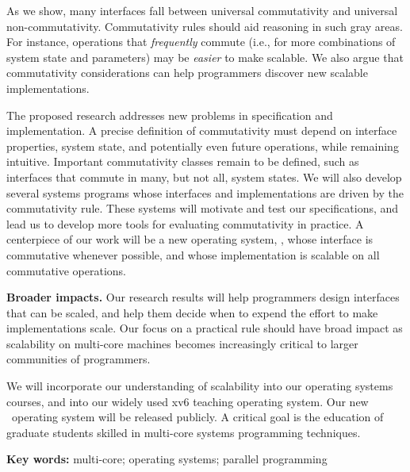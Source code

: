 As we show, many interfaces fall between universal commutativity
and universal non-commutativity.
%
Commutativity rules should aid reasoning in
such gray areas.
%
For instance, operations that \emph{frequently} commute (i.e., for
more combinations of system state and parameters)
may be \emph{easier} to make
scalable.
%
We also argue that commutativity considerations can 
help programmers discover new scalable implementations.

The proposed research addresses new problems in specification and
implementation.
%
A precise definition of commutativity must depend on interface properties,
system state, and potentially even future operations, while remaining
intuitive.
%
Important commutativity classes remain to be defined, such as
interfaces that commute in many, but not all, system states.
%
We will also develop several systems programs whose
interfaces and implementations are driven by the
commutativity rule.
%
These systems will motivate and test our specifications,
and lead us to develop more tools for evaluating commutativity in
practice.
%
A centerpiece of our work will be a new operating
system, \sys, whose interface is commutative whenever possible, and
whose implementation is scalable on all commutative operations.


\textbf{Broader impacts.}
%
Our research results will help programmers design interfaces that can
be scaled, and help them decide when to expend the effort to make
implementations scale. 
%
Our focus on a practical rule should have
broad impact as scalability on multi-core machines becomes increasingly
critical to larger communities of programmers.

We will incorporate our understanding of scalability into our operating
systems courses, and into our widely used xv6 teaching operating system.
%
Our new \sys\ operating system will be released publicly.
%
A critical goal is the education of graduate students skilled in
multi-core systems programming techniques.

\textbf{Key words:}   multi-core; operating systems; parallel programming
